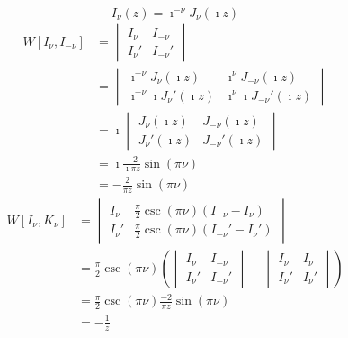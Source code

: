 {%
\begin{Solution}
  \[
  I_\nu(z) = \imath^{-\nu} J_\nu(\imath z)
  \]
  \begin{align*}
    W \left[ I_\nu, I_{-\nu} \right]
    &=
    \begin{vmatrix}
      I_\nu & I_{-\nu} \\
      I_\nu' & I_{-\nu}'
    \end{vmatrix} 
    \\
    &=
    \begin{vmatrix}
      \imath^{-\nu} J_\nu(\imath z) & \imath^\nu J_{-\nu}(\imath z) \\
      \imath^{-\nu} \imath J_\nu'(\imath z) & \imath^\nu \imath J_{-\nu}'(\imath z)
    \end{vmatrix} \\
    &= \imath
    \begin{vmatrix}
      J_\nu(\imath z) & J_{-\nu}(\imath z) \\
      J_\nu'(\imath z) & J_{-\nu}'(\imath z)
    \end{vmatrix} \\
    &= \imath \frac{-2}{\imath \pi z} \sin(\pi \nu) \\
    &= - \frac{2}{\pi z} \sin(\pi \nu)
  \end{align*}
  \begin{align*}
    W \left[ I_\nu, K_\nu \right]
    &=
    \begin{vmatrix}
      I_\nu & \frac{\pi}{2} \csc(\pi \nu) (I_{-\nu} - I_\nu) \\
      I_\nu' & \frac{\pi}{2} \csc(\pi \nu) (I_{-\nu}' - I_\nu')
    \end{vmatrix} \\
    &=
    \frac{\pi}{2} \csc(\pi \nu) \left(
      \begin{vmatrix}
        I_\nu & I_{-\nu} \\
        I_\nu' & I_{-\nu}'
      \end{vmatrix}
      -
      \begin{vmatrix}
        I_\nu & I_\nu \\
        I_\nu' & I_\nu'
      \end{vmatrix}
    \right) \\
    &=
    \frac{\pi}{2} \csc(\pi \nu) \frac{-2}{\pi z} \sin(\pi \nu) \\
    &=
    -\frac{1}{z}
  \end{align*}
\end{Solution}








}
